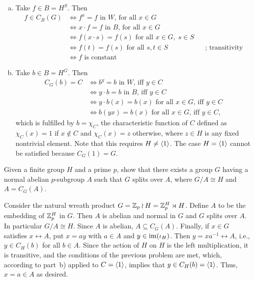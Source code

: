 \begin{solution}
\begin{enumerate}[a),font=\upshape]
    \item Take $f\in B=H^S$. Then
    \begin{align*}
        f\in C_B(G) &\iff f^x=f\text{ in $W$, for all }x\in G\\
            &\iff x\cdot f= f\text{ in $B$, for all }x\in G\\
            &\iff f(x\cdot s)=f(s)\text{ for all }x\in G,\;s\in S\\
            &\iff f(t)=f(s)\text{ for all }s,t\in S&&\text{; transitivity}\\
            &\iff f\text{ is constant}
    \end{align*}

    \item Take $b\in B=H^G$. Then
    \begin{align*}
        C_G(b) = C &\iff b^y=b\text{ in $W$, iff }y\in C\\
            &\iff y\cdot b= b\text{ in $B$, iff }y\in C\\
            &\iff y\cdot b(x)=b(x)\text{ for all $x\in G$, iff }y\in C\\
            &\iff b(yx) = b(x)\text{ for all $x\in G$, iff }y\in C,
    \end{align*}
    which is fulfilled by $b=\chi_C$, the characteristic function of $C$ defined as $\chi_C(x)=1$ if $x\notin C$ and $\chi_C(x)=z$ otherwise, where $z\in H$ is any fixed nontrivial element. Note that this requires $H\ne\langle1\rangle$. The case\/ $H=\langle1\rangle$ cannot be satisfied because $C_G(1)=G$.
\end{enumerate}
\end{solution}

\begin{probl}
    Given a finite group\/ $H$ and a prime\/ $p$, show that there exists a group\/ $G$ having a normal abelian\/ $p$-subgroup\/ $A$ such that\/ $G$ splits over\/ $A$, where\/ $G/A \cong H$ and\/ $A = C_G(A)$.
\end{probl}

\begin{solution}
    Consider the natural wreath product $G=\mathbb{Z}_p\wr H=\mathbb{Z}_p^H\rtimes H$. Define $A$ to be the embedding of $\mathbb{Z}_p^H$ in $G$. Then $A$ is abelian and normal in $G$ and $G$ splits over $A$. In particular $G/A\cong H$. Since $A$ is abelian, $A\subseteq C_G(A)$. Finally, if $x\in G$ satisfies $x\leftrightarrow A$, put $x=ay$ with $a\in A$ and $y\in\operatorname{im}(\iota_H)$. Then $y=xa^{-1}\leftrightarrow A$, i.e., $y\in C_H(b)$ for all $b\in A$. Since the action of $H$ on $H$ is the left multiplication, it is transitive, and the conditions of the previous problem are met, which, according to part~b) applied to $C=\langle1\rangle$, implies that $y\in C_H(b)=\langle1\rangle$. Thus, $x=a\in A$ as desired.
\end{solution}

